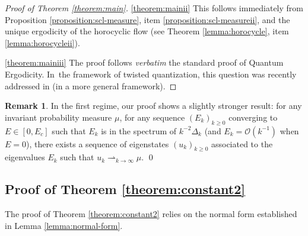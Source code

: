 \documentclass[10pt]{amsart}
\theoremstyle{plain}
\theoremstyle{definition}
\newtheorem{remark}[theorem]{Remark}
\newcommand{\bigo}{\mathcal{O}}
\begin{document}
\begin{proof}[Proof of Theorem \ref{theorem:main}]
\smallskip

\eqref{theorem:mainii}
This follows immediately from Proposition \ref{proposition:scl-measure}, item \eqref{proposition:scl-measureii}, and the unique ergodicity of the horocyclic flow (see Theorem \ref{lemma:horocycle}, item \eqref{lemma:horocycleii}).

\smallskip

\eqref{theorem:mainiii}
The proof follows \emph{verbatim} the standard proof of Quantum Ergodicity. In~the framework of twisted quantization, this question was recently addressed in \cite[\S 5.3]{Cekic-Lefeuvre-24} (in a more general framework).
\end{proof}

\begin{remark} In the first regime, our proof shows a slightly
stronger result: for any invariant probability measure $\mu$, for any sequence
$(E_k)_{k \geq 0 }$ converging to $E \in [0, E_c]$ such that $E_k$ is in the spectrum of
$k^{-2} \Delta_k$ (and $E_k= \bigo (k^{-1})$ when $E=0$), there exists a
sequence of eigenstates $(u_k)_{k \geq 0}$ associated to the eigenvalues $E_k$ such that $u_{k}
\rightharpoonup_{k \to \infty} \mu$.
\qed \end{remark}

\subsection{Proof of Theorem \ref{theorem:constant2}} \label{ssection:proof2}The proof of Theorem \ref{theorem:constant2} relies on the normal form established in Lemma \ref{lemma:normal-form}.
\end{document}
